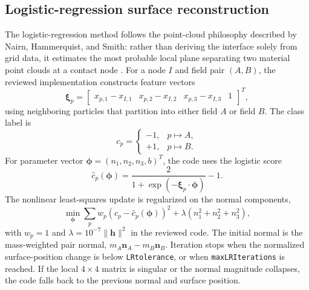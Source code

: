\subsection{Logistic-regression surface reconstruction}
\label{subsec:logistic-regression-contact-normal}

The logistic-regression method follows the point-cloud philosophy described by Nairn, Hammerquist, and Smith: rather than deriving the interface solely from grid data, it estimates the most probable local plane separating two material point clouds at a contact node \cite{nairn2020contact}.  For a node $I$ and field pair $(A,B)$, the reviewed implementation constructs feature vectors
\begin{equation}
  \boldsymbol{\xi}_p=\begin{bmatrix}
  x_{p,1}-x_{I,1} & x_{p,2}-x_{I,2} & x_{p,3}-x_{I,3} & 1
  \end{bmatrix}^{T},
\end{equation}
using neighboring particles that partition into either field $A$ or field $B$.  The class label is
\begin{equation}
  c_p=\begin{cases}
  -1, & p\mapsto A,\\
  +1, & p\mapsto B.
  \end{cases}
\end{equation}
For parameter vector $\boldsymbol{\phi}=(n_1,n_2,n_3,b)^T$, the code uses the logistic score
\begin{equation}
  \widehat{c}_p(\boldsymbol{\phi})=\frac{2}{1+\exp(-\boldsymbol{\xi}_p\cdot\boldsymbol{\phi})}-1.
\end{equation}
The nonlinear least-squares update is regularized on the normal components,
\begin{equation}
  \min_{\boldsymbol{\phi}}
  \sum_{p} w_p\left(c_p-\widehat{c}_p(\boldsymbol{\phi})\right)^2
  +\lambda\left(n_1^2+n_2^2+n_3^2\right),
  \label{eq:contact-logistic-objective}
\end{equation}
with $w_p=1$ and $\lambda=10^{-7}\|\mathbf{h}\|^2$ in the reviewed code.  The initial normal is the mass-weighted pair normal, $m_A\mathbf{n}_A-m_B\mathbf{n}_B$.  Iteration stops when the normalized surface-position change is below \texttt{LRtolerance}, or when \texttt{maxLRIterations} is reached.  If the local $4\times4$ matrix is singular or the normal magnitude collapses, the code falls back to the previous normal and surface position.

